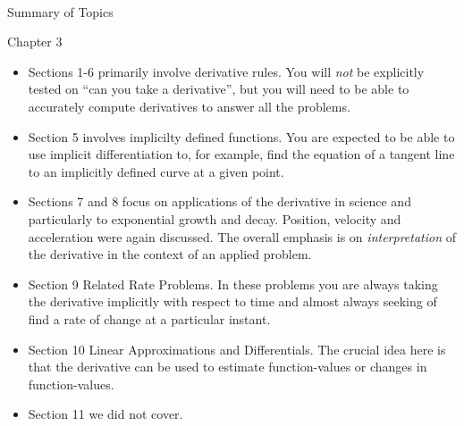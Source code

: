 \documentclass[11pt,fleqn]{article}
\newcommand{\bc}{\begin{center}}
\newcommand{\ec}{\end{center}}
\begin{document}
\vspace*{-0.7in}

\begin{center}
  \large
  \\
\end{center}


\bc Summary of Topics \ec
Chapter 3\\
\begin{itemize}
	\item Sections 1-6 primarily involve derivative rules. You will \emph{not} be explicitly tested on ``can you take a derivative'', but you will need to be able to accurately compute derivatives to answer all the problems. 
	\item Section 5 involves implicilty defined functions. You are expected to be able to use implicit differentiation to, for example, find the equation of a tangent line to an implicitly defined curve at a given point.
	\item Sections 7 and 8 focus on applications of the derivative in science and particularly to exponential growth and decay. Position, velocity and acceleration were again discussed. The overall emphasis is on \emph{interpretation} of the derivative in the context of an applied problem.
	\item Section 9 Related Rate Problems. In these problems you are always taking the derivative implicitly with respect to time and almost always seeking of find a rate of change at a particular instant.
	\item Section 10 Linear Approximations and Differentials. The crucial idea here is that the derivative can be used to estimate function-values or changes in function-values.
	\item Section 11 we did not cover.
\end{itemize}
\end{document}
